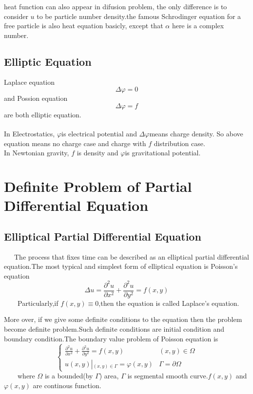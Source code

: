 \documentclass[a4paper]{article}
\begin{document}
heat function can also appear in difusion problem, the only difference
is to consider $u$ to be particle number density.the famous Schrodinger
equation for a free particle is also heat equation basicly, except
that $\alpha$ here is a complex number.

\subsection{Elliptic Equation}


Laplace equation 
\begin{equation}
\Delta\varphi=0
\end{equation}
and Possion equation
\begin{equation}
\Delta\varphi=f
\end{equation}
are both elliptic equation.
\\\\
In Electrostatics, $\varphi$is electrical potential and $\Delta\varphi$means
charge density. So above equation means no charge case and charge
with $f$ distribution case.
\\
In Newtonian gravity, $f$ is density and $\varphi$is gravitational
potential.

\section{Definite Problem of Partial Differential Equation}

\subsection{Elliptical Partial Differential Equation}

\ \ \ The process that fixes time can be described as an elliptical partial
differential equation.The most typical and simplest form of elliptical
equation is Poisson's equation
\begin{equation}
  \Delta u = \frac{\partial^2 u}{\partial x^2} + \frac{\partial^2 u}{\partial
  y^2} = f \left( x, y \right)
\end{equation}
\ \ \ \ Particularly,if $f \left( x, y \right) \equiv 0$,then the equation is
called Laplace's equation.

More over, if we give some definite conditions to the equation then the
problem become definite problem.Such definite conditions are initial condition
and boundary condition.The boundary value problem of Poisson equation is
{\cite{Lu&Guan}}
\[ \left\{ \begin{array}{lr}
     \frac{\partial^2 u}{\partial x^2} + \frac{\partial^2 u}{\partial y^2} = f
     \left( x, y \right)  & \left( x, y \right) \in \Omega\\
     u \left( x, y \right) \left|_{\left( x, y \right) \in \Gamma} = \right.
     \varphi \left( x, y \right) & \Gamma = \partial \Omega
   \end{array} \right. \]
\ \ \ \ where $\Omega$ is a bounded(by $\Gamma$) area, $\Gamma$ is segmental
smooth curve.$f \left( x, y \right)$ and $\varphi \left( x, y \right)$ are
continous function.
\end{document}

